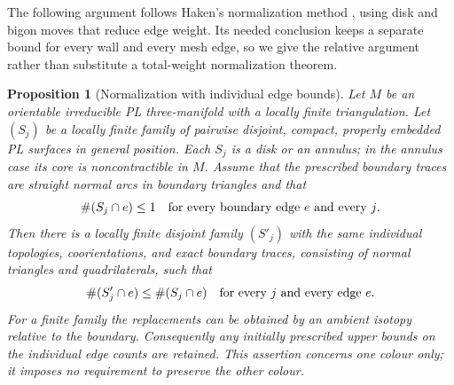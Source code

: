 \documentclass[11pt]{article}
\numberwithin{equation}{section}
\newtheorem{proposition}[theorem]{Proposition}
\theoremstyle{definition}
\theoremstyle{remark}
\begin{document}
The following argument follows Haken's normalization method
\cite[Chapter~I, \S5]{Haken1961}, using disk and bigon moves that reduce
edge weight.  Its needed conclusion keeps a separate
bound for every wall and every mesh edge, so we give the relative
argument rather than substitute a total-weight normalization theorem.

\begin{proposition}[Normalization with individual edge bounds]
\label{wl:normalization}
Let $M$ be an orientable irreducible PL three-manifold with a locally finite
triangulation.  Let $(S_j)$ be a locally finite family of pairwise disjoint,
compact, properly embedded PL surfaces in general position.  Each $S_j$ is a
disk or an annulus; in the annulus case its core is noncontractible in $M$.
Assume that the prescribed boundary traces are straight normal arcs in boundary
triangles and that
\[
                  \#(S_j\cap e)\leq 1
       \quad\hbox{for every boundary edge $e$ and every $j$}.
\]
Then there is a locally finite disjoint family $(S'_j)$ with the same individual
topologies, coorientations, and exact boundary traces, consisting of normal
triangles and quadrilaterals, such that
\[
                  \#(S'_j\cap e)\leq\#(S_j\cap e)
                    \quad\hbox{for every $j$ and every edge $e$}.
\]
For a finite family the replacements can be obtained by an ambient isotopy
relative to the boundary.  Consequently any initially prescribed upper bounds
on the individual edge counts are retained.  This assertion concerns one
colour only; it imposes no requirement to preserve the other colour.
\end{proposition}
\end{document}
